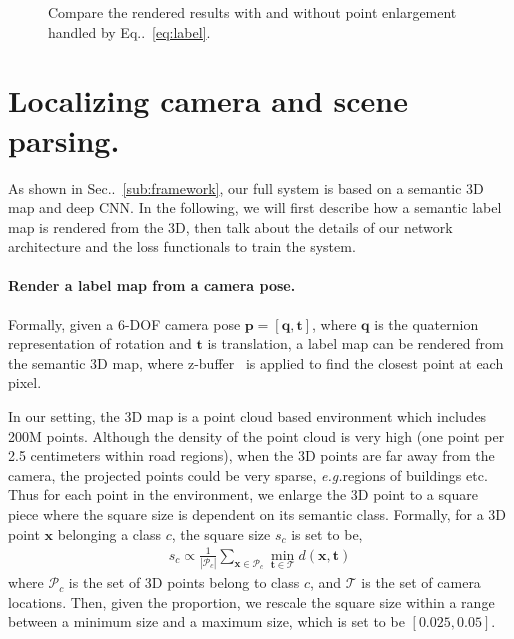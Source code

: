 \documentclass[10pt,twocolumn,letterpaper]{article}
\makeatletter
\newcommand{\equref}[1]{Eq\onedot~\eqref{#1}}
\newcommand{\secref}[1]{Sec\onedot~\ref{#1}}
\newcommand{\ve}[1]{{\mathbf #1}} %
\newcommand{\hua}[1]{{\mathcal #1}}
\DeclareRobustCommand\onedot{\futurelet\@let@token\@onedot}
\def\onedot{\ifx\@let@token.\else.\null\fi\xspace}
\def\eg{\emph{e.g.}}
\makeatother
\begin{document}
\begin{figure}[t]
\begin{center}
\fbox{\rule{0pt}{2in} \rule{0.9\linewidth}{0pt}}
\end{center}
   \caption{Compare the rendered results with and without point enlargement handled by \equref{eq:label}.}
\label{fig:render}
\end{figure}

\section{Localizing camera and scene parsing.}
\label{sec:localize_and_parsing}
As shown in \secref{sub:framework}, our full system is based on a semantic 3D map and deep CNN. In the following, we will first describe how a semantic label map is rendered from the 3D, then talk about the details of our network architecture and the loss functionals to train the system.

\paragraph{Render a label map from a camera pose.} 
Formally, given a 6-DOF camera pose $\ve{p} = [\ve{q}, \ve{t}]$, where $\ve{q}$ is the quaternion representation of rotation and $\ve{t}$ is translation, a label map can be rendered from the semantic 3D map, where z-buffer~\cite{} is applied to find the closest point at each pixel.

In our setting, the 3D map is a point cloud based environment which includes 200M points. Although the density of the point cloud is very high (one point per 2.5 centimeters within road regions), when the 3D points are far away from the camera, the projected points could be very sparse, \eg regions of buildings etc.
Thus for each point in the environment, we enlarge the 3D point to a square piece where the square size is dependent on its semantic class. Formally, for a 3D point $\ve{x}$ belonging a class $c$, the square size $s_c$ is set to be,
\begin{align}
\label{eq:square_size}
s_c \propto \frac{1}{|\hua{P}_c|}\sum_{\ve{x}\in \hua{P}_c} \min_{\ve{t}\in\hua{T}} d(\ve{x}, \ve{t})
\end{align}
where $\hua{P}_c$ is the set of 3D points belong to class $c$, and $\hua{T}$ is the set of camera locations. Then, given the proportion, we rescale the square size within a range between a minimum size and a maximum size, which is set to be $[0.025, 0.05]$.
\end{document}
